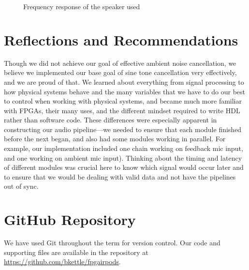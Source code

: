\documentclass{fpgairpods}
\begin{document}
\begin{figure}
    \centering
    \caption{Frequency response of the speaker used}
    \label{chart:speaker_response}
\end{figure}

\section{Reflections and Recommendations}



Though we did not achieve our goal of effective ambient noise cancellation, we believe we implemented our base goal of sine tone cancellation very effectively, and we are proud of that. We learned about everything from signal processing to how physical systems behave and the many variables that we have to do our best to control when working with physical systems, and became much more familiar with FPGAs, their many uses, and the different mindset required to write HDL rather than software code. These differences were especially apparent in constructing our audio pipeline---we needed to ensure that each module finished before the next began, and also had some modules working in parallel. For example, our implementation included one chain working on feedback mic input, and one working on ambient mic input). Thinking about the timing and latency of different modules was crucial here to know which  signal would occur later and to ensure that we would be dealing with valid data and not have the pipelines out of sync. 

\appendix
\section{GitHub Repository}
We have used Git throughout the term for version control. Our code and supporting files are available in the repository at \url{https://github.com/bkettle/fpgairpods}.

\printbibliography
\end{document}
